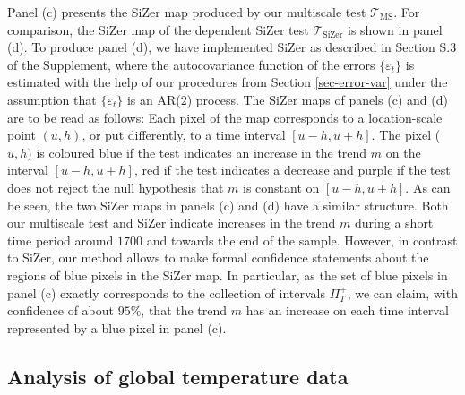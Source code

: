 Panel (c) presents the SiZer map produced by our multiscale test $\mathcal{T}_{\text{MS}}$. For comparison, the SiZer map of the dependent SiZer test $\mathcal{T}_{\text{SiZer}}$ is shown in panel (d). To produce panel (d), we have implemented SiZer as described in Section S.3 of the Supplement, where the autocovariance function of the errors $\{\varepsilon_t\}$ is estimated with the help of our procedures from Section \ref{sec-error-var} under the assumption that $\{\varepsilon_t\}$ is an AR($2$) process. The SiZer maps of panels (c) and (d) are to be read as follows: Each pixel of the map corresponds to a location-scale point $(u,h)$, or put differently, to a time interval $[u-h,u+h]$. The pixel ($u,h)$ is coloured blue if the test indicates an increase in the trend $m$ on the interval $[u-h,u+h]$, red if the test indicates a decrease and purple if the test does not reject the null hypothesis that $m$ is constant on $[u-h,u+h]$. 
As can be seen, the two SiZer maps in panels (c) and (d) have a similar structure. Both our multiscale test and SiZer indicate increases in the trend $m$ during a short time period around $1700$ and towards the end of the sample. However, in contrast to SiZer, our method allows to make formal confidence statements about the regions of blue pixels in the SiZer map. In particular, as the set of blue pixels in panel (c) exactly corresponds to the collection of intervals $\Pi_T^+$, we can claim, with confidence of about $95\%$, that the trend $m$ has an increase on each time interval represented by a blue pixel in panel (c). 


\subsection{Analysis of global temperature data}


